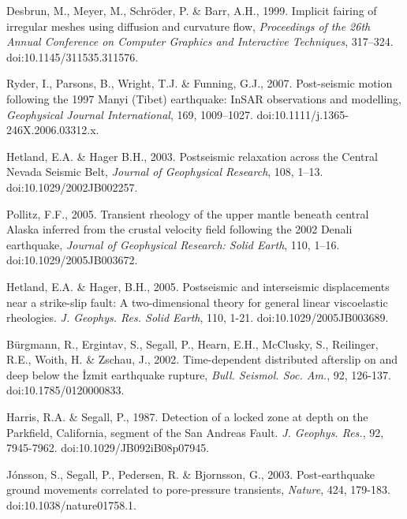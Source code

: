 \documentclass[12pt]{article}
\begin{document}
\begin{thebibliography}{}

 Desbrun, M., Meyer, M.,
  Schr\"oder, P. \& Barr, A.H., 1999.  Implicit fairing of irregular
  meshes using diffusion and curvature flow, \textit{Proceedings of
    the 26th Annual Conference on Computer Graphics and Interactive
    Techniques}, 317–324. doi:10.1145/311535.311576.

 Ryder, I., Parsons, B.,
  Wright, T.J. \& Funning, G.J., 2007.  Post-seismic motion following
  the 1997 Manyi (Tibet) earthquake: InSAR observations and
  modelling, \textit{Geophysical Journal International}, 169,
  1009–1027. doi:10.1111/j.1365-246X.2006.03312.x.

 Hetland, E.A. \&
  Hager B.H., 2003. Postseismic relaxation across the Central
    Nevada Seismic Belt, \textit{Journal of Geophysical Research}, 108,
  1–13. doi:10.1029/2002JB002257.

Pollitz, F.F., 2005. Transient
  rheology of the upper mantle beneath central Alaska inferred from
  the crustal velocity field following the 2002 Denali earthquake,
  \textit{Journal of Geophysical Research: Solid Earth}, 110,
  1–16. doi:10.1029/2005JB003672.

 Hetland, E.A. \&
  Hager, B.H., 2005. Postseismic and interseismic displacements near a
  strike-slip fault: A two-dimensional theory for general linear
  viscoelastic rheologies. \textit{J. Geophys. Res. Solid Earth}, 110,
  1-21. doi:10.1029/2005JB003689.

 B\"urgmann, R.,
  Ergintav, S., Segall, P., Hearn, E.H., McClusky, S., Reilinger,
  R.E., Woith, H. \& Zschau, J., 2002. Time-dependent distributed
  afterslip on and deep below the \.Izmit earthquake rupture,
  \textit{Bull.  Seismol. Soc. Am.}, 92,
  126-137. doi:10.1785/0120000833.

 Harris, R.A. \&
  Segall, P., 1987. Detection of a locked zone at depth on the
  Parkfield, California, segment of the San Andreas
  Fault. \textit{J. Geophys. Res.}, 92,
  7945-7962. doi:10.1029/JB092iB08p07945.

 J\'onsson, S.,
  Segall, P., Pedersen, R. \& Bjornsson, G., 2003. Post-earthquake
  ground movements correlated to pore-pressure transients,
  \textit{Nature}, 424, 179-183. doi:10.1038/nature01758.1.


\end{thebibliography}
\end{document}
